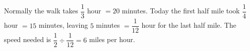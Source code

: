 Normally the walk takes $\dfrac13$ hour $=20$ minutes. Today the first half mile took $\dfrac14$ hour $=15$ minutes, leaving $5$ minutes $=\dfrac1{12}$ hour for the last half mile. The speed needed is $\dfrac12\div\dfrac1{12}=\boxed{6}$ miles per hour.
